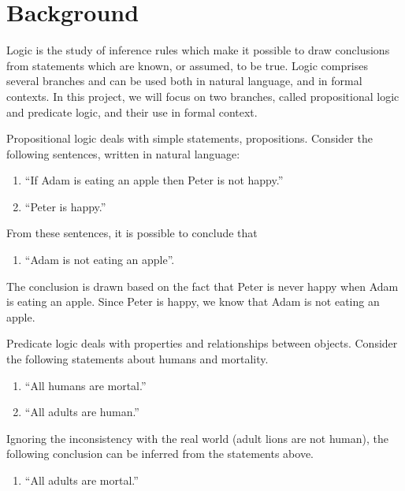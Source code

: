 \section{Background}

Logic is the study of inference rules which make it possible to draw conclusions from statements which are known, or assumed, to be true. Logic comprises several branches and can be used both in natural language, and in formal contexts. In this project, we will focus on two branches, called propositional logic and predicate logic, and their use in formal context.

Propositional logic deals with simple statements, propositions. Consider the following sentences, written in natural language:

\begin{enumerate}
      \item ``If Adam is eating an apple then Peter is not happy.''
      \item ``Peter is happy.''
\end{enumerate}

From these sentences, it is possible to conclude that

\begin{enumerate}[resume]
      \item ``Adam is not eating an apple''.
\end{enumerate}

The conclusion is drawn based on the fact that Peter is never happy when Adam is eating an apple. Since Peter is happy, we know that Adam is not eating an apple.

Predicate logic deals with properties and relationships between objects. Consider the following statements about humans and mortality.

\begin{enumerate}[resume]
      \item ``All humans are mortal.''
      \item ``All adults are human.''
\end{enumerate}

Ignoring the inconsistency with the real world (adult lions are not human), the following conclusion can be inferred from the statements above.

\begin{enumerate}[resume]
      \item ``All adults are mortal.''
\end{enumerate}

